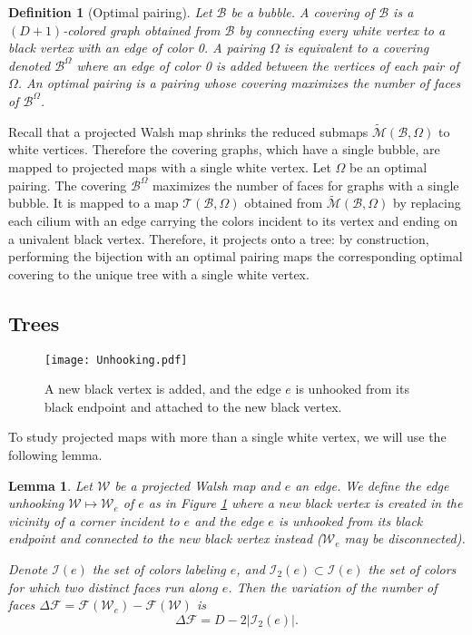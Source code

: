 \documentclass[aps,prd,10pt,notitlepage,nofootinbib,superscriptaddress,showkeys,showpacs]{revtex4-1}
\newtheorem{lemma}{Lemma}
\newtheorem{definition}{Definition}
\begin{document}
\begin{definition}[Optimal pairing] \label{def:OptimalPairing}
Let ${\mathcal{B}}$ be a bubble. A covering of ${\mathcal{B}}$ is a $(D+1)$-colored graph obtained from ${\mathcal{B}}$ by connecting every white vertex to a black vertex with an edge of color 0. A pairing $\Omega$ is equivalent to a covering denoted ${\mathcal{B}}^{\Omega}$ where an edge of color 0 is added between the vertices of each pair of $\Omega$. An optimal pairing is a pairing whose covering maximizes the number of faces of ${\mathcal{B}}^{\Omega}$.
\end{definition}

Recall that a projected Walsh map shrinks the reduced submaps $\tilde{\mathcal{M}}({\mathcal{B}}, \Omega)$ to white vertices. Therefore the covering graphs, which have a single bubble, are mapped to projected maps with a single white vertex. Let $\Omega$ be an optimal pairing. The covering ${\mathcal{B}}^{\Omega}$ maximizes the number of faces for graphs with a single bubble. It is mapped to a map ${\mathcal{T}}({\mathcal{B}}, \Omega)$ obtained from $\tilde{\mathcal{M}}({\mathcal{B}}, \Omega)$ by replacing each cilium with an edge carrying the colors incident to its vertex and ending on a univalent black vertex. Therefore, it projects onto a tree: by construction, performing the bijection with an optimal pairing maps the corresponding optimal covering to the unique tree with a single white vertex.

\subsection{Trees}

\begin{figure}
\texttt{[image: Unhooking.pdf]}
\caption{\label{fig:Unhooking} A new black vertex is added, and the edge $e$ is unhooked from its black endpoint and attached to the new black vertex.}
\end{figure}

To study projected maps with more than a single white vertex, we will use the following lemma.

\begin{lemma} \label{lemma:Unhooking}
Let ${\mathcal{W}}$ be a projected Walsh map and $e$ an edge. We define the \emph{edge unhooking} ${\mathcal{W}}\mapsto {\mathcal{W}}_e$ of $e$ as in Figure \ref{fig:Unhooking} where a new black vertex is created in the vicinity of a corner incident to $e$ and the edge $e$ is unhooked from its black endpoint and connected to the new black vertex instead (${\mathcal{W}}_e$ may be disconnected).

Denote ${\mathcal{I}}(e)$ the set of colors labeling $e$, and ${\mathcal{I}}_2(e)\subset {\mathcal{I}}(e)$ the set of colors for which two distinct faces run along $e$. Then the variation of the number of faces $\Delta {\mathcal{F}} = {\mathcal{F}}({\mathcal{W}}_e) - {\mathcal{F}}({\mathcal{W}})$ is
\begin{equation}
\Delta {\mathcal{F}} = D-2\lvert{\mathcal{I}}_2(e)\rvert.
\end{equation}
\end{lemma}
\end{document}
